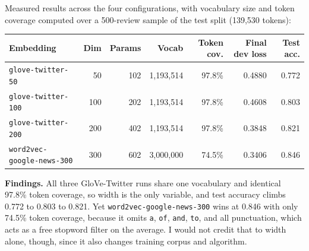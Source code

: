 \documentclass[11pt]{article}
\begin{document}
Measured results across the four configurations, with vocabulary size and token coverage computed
over a 500-review sample of the test split (139,530 tokens):

\begin{center}
\small
\begin{tabular}{|l|r|r|r|r|r|r|}
  \hline
  Embedding & Dim & Params & Vocab & Token cov. & Final dev loss & Test acc. \\
  \hline
  \texttt{glove-twitter-50} & 50 & 102 & 1,193,514 & 97.8\% & 0.4880 & 0.772 \\
  \texttt{glove-twitter-100} & 100 & 202 & 1,193,514 & 97.8\% & 0.4608 & 0.803 \\
  \texttt{glove-twitter-200} & 200 & 402 & 1,193,514 & 97.8\% & 0.3848 & 0.821 \\
  \texttt{word2vec-google-news-300} & 300 & 602 & 3,000,000 & 74.5\% & 0.3406 & 0.846 \\
  \hline
\end{tabular}
\end{center}

\textbf{Findings.}
All three GloVe-Twitter runs share one vocabulary and identical 97.8\% token coverage, so width is the
only variable, and test accuracy climbs 0.772 to 0.803 to 0.821. Yet \texttt{word2vec-google-news-300}
wins at 0.846 with only 74.5\% token coverage, because it omits \texttt{a}, \texttt{of}, \texttt{and},
\texttt{to}, and all punctuation, which acts as a free stopword filter on the average. I would not credit
that to width alone, though, since it also changes training corpus and algorithm.
\end{document}

